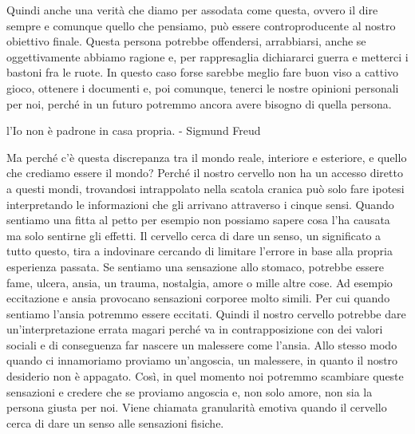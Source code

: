 \documentclass[12pt]{book} %
\begin{document}
Quindi anche una verità che diamo per assodata come questa, ovvero il dire sempre e comunque quello che pensiamo, può
essere controproducente al nostro obiettivo finale. Questa persona potrebbe offendersi, arrabbiarsi, anche se
oggettivamente abbiamo ragione e, per rappresaglia dichiararci guerra e metterci i bastoni fra le ruote. In questo caso
forse sarebbe meglio fare buon viso a cattivo gioco, ottenere i documenti e, poi comunque, tenerci le nostre opinioni
personali per noi, perché in un futuro potremmo ancora avere bisogno di quella persona.


\bigskip

l'Io non è padrone in casa propria. - Sigmund Freud

Ma perché c'è questa discrepanza tra il mondo reale, interiore e esteriore, e quello che crediamo
essere il mondo? Perché il nostro cervello non ha un accesso diretto a questi mondi, trovandosi intrappolato nella
scatola cranica può solo fare ipotesi interpretando le informazioni che gli arrivano attraverso i cinque sensi. Quando
sentiamo una fitta al petto per esempio non possiamo sapere cosa l'ha causata ma solo sentirne gli effetti. Il cervello
cerca di dare un senso, un significato a tutto questo, tira a indovinare cercando di limitare
l'errore in base alla propria esperienza passata. Se sentiamo una sensazione allo stomaco,
potrebbe essere fame, ulcera, ansia, un trauma, nostalgia, amore o mille altre cose. Ad esempio eccitazione e ansia
provocano sensazioni corporee molto simili. Per cui quando sentiamo l'ansia potremmo essere
eccitati. Quindi il nostro cervello potrebbe dare un'interpretazione errata magari perché va in contrapposizione con
dei valori sociali e di conseguenza far nascere un malessere come l'ansia. Allo stesso modo quando ci innamoriamo
proviamo un'angoscia, un malessere, in quanto il nostro desiderio non è appagato. Così, in quel momento noi potremmo
scambiare queste sensazioni e credere che se proviamo angoscia e, non solo amore, non sia la persona giusta per noi.
Viene chiamata granularità emotiva quando il cervello cerca di dare un senso alle sensazioni
fisiche. 
\end{document}
